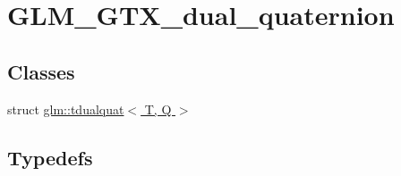 \hypertarget{group__gtx__dual__quaternion}{}\section{G\+L\+M\+\_\+\+G\+T\+X\+\_\+dual\+\_\+quaternion}
\label{group__gtx__dual__quaternion}
\subsection*{Classes}
\begin{DoxyCompactItemize}
\item 
struct \hyperlink{structglm_1_1tdualquat}{glm\+::tdualquat$<$ T, Q $>$}
\end{DoxyCompactItemize}
\subsection*{Typedefs}
